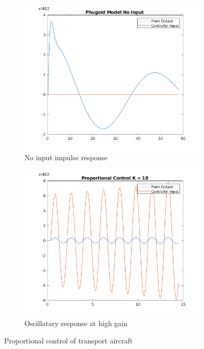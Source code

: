 \documentclass{article}
\begin{document}
\begin{figure}[htp]
\centering
\begin{subfigure}{.5\textwidth}
  \centering
  \includegraphics[width=0.9\linewidth]{3_1_phygoid_Model_no_input.png}
	\caption{No input impulse response}
	\label{fig:transport_noinput}
\end{subfigure}%
\begin{subfigure}{.5\textwidth}
  \centering
  \includegraphics[width=0.9\linewidth]{3_2_autopilot.png}
  \caption{Oscillatary response at high gain}
  \label{fig:transport_osci}
\end{subfigure}
\caption{Proportional control of transport aircraft}
\end{figure}
\end{document}
